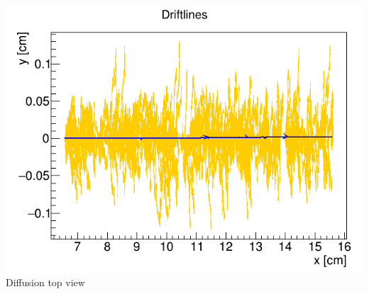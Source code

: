 \documentclass{beamer}
\begin{document}
\begin{frame}
\begin{columns}
				\centering
				\includegraphics[width = 0.95 \linewidth]{../images/drift_xy.png}
				Diffusion top view
		\end{columns}
	\end{frame}
\end{document}
